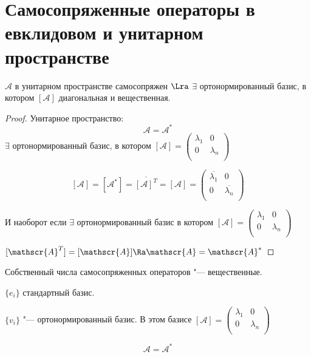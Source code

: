 \section{Самосопряженные операторы в евклидовом и унитарном пространстве}

\begin{theorem}{}
$\mathscr{A}$ в унитарном пространстве самосопряжен $\Lra$
$\exists$ ортонормированный базис, в котором $[\mathscr{A}]$ диагональная и вещественная. 
\end{theorem}

\begin{proof}

Унитарное пространство:
 $$\mathscr{A} = \mathscr{A}^*$$
$\exists$ ортонормированный базис, в котором 
$[\mathscr{A}] = \begin{pmatrix}
\lambda_1&0\\
0&\lambda_n\\
\end{pmatrix}$

$$[\mathscr{A}] = [\mathscr{A}^*] = \overline{[\mathscr{A}]^{T}} = [\mathscr{A}] = \begin{pmatrix}
\overline{\lambda_1}&0\\
0&\overline{\lambda_n}\\
\end{pmatrix} $$

И наоборот если 
$\exists$ ортонормированный базис в котором $[\mathscr{A}] = \begin{pmatrix}
\lambda_1&0\\
0&\lambda_n\\
\end{pmatrix}$ 

$[\mathscr{A}^T] = [\mathscr{A}] \Ra \mathscr{A} = \mathscr{A}^*$ 

\end{proof}

\begin{conseq}
Собственный числа самосопряженных операторов "--- вещественные. 
\end{conseq}

$\{e_{i}\}$ стандартный базис. 

$\{v_i\}$ "--- ортонормированный базис. 
В этом базисе $[\mathscr{A}] = \begin{pmatrix}
\lambda_1&0\\
0&\lambda_n\\
\end{pmatrix}$ 

$$\mathscr{A} = \mathscr{A}^*$$

